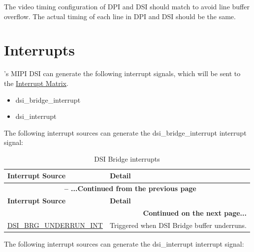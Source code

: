 \documentclass[main\_\_EN.tex]{subfiles}
\begin{document}
The video timing configuration of DPI and DSI should match to avoid line buffer overflow. The actual timing of each line in DPI and DSI should be the same.


\section{Interrupts}
\chipname{}'s MIPI DSI can generate the following interrupt signals, which will be sent to the \hyperref[mod:intmtrx]{Interrupt Matrix}.

\begin{itemize}
    \item dsi\_bridge\_interrupt
    \item dsi\_interrupt
\end{itemize}

The following interrupt sources can generate the dsi\_bridge\_interrupt interrupt signal:

\begin{longtable}[c]{ |p{5cm}|p{10cm}| }
    \caption{DSI Bridge interrupts}
    \label{tab:dsi-bridge-intr}\\\hline

    \rowcolor{lightgray}
    \textbf{Interrupt Source} & \textbf{Detail} \\\hline
    \endfirsthead


    \multicolumn{2}{c}{\bfseries \tablename\ \thetable{} -- ...Continued from the previous page}\\\hline
    \rowcolor{lightgray}
    \textbf{Interrupt Source} & \textbf{Detail} \\\hline
    \endhead

    \multicolumn{2}{r}{\textbf{Continued on the next page...}} \\
    \endfoot

    \endlastfoot

    \hyperref[fielddesc:DSIBRGUNDERRUNINTRAW]{DSI\_BRG\_UNDERRUN\_INT} & Triggered when DSI Bridge buffer underruns. \\\hline
        

\end{longtable}

The following interrupt sources can generate the dsi\_interrupt interrupt signal:
\end{document}
